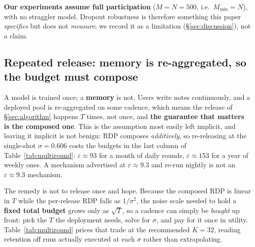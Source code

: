 \documentclass[pdflatex,sn-mathphys-num,iicol]{sn-jnl}
\theoremstyle{thmstyleone}%
\theoremstyle{thmstyletwo}%
\theoremstyle{thmstylethree}%
\newcommand{\eps}{\varepsilon}
\newcommand{\secref}[1]{\S\ref{#1}}
\begin{document}
\textbf{Our experiments assume full participation} ($M = N = 500$, i.e.\
$M_{\min} = N$), with no straggler model. Dropout robustness is therefore something
this paper \emph{specifies} but does not \emph{measure}; we record it as a limitation
(\secref{sec:discussion}), not a claim.

\subsection{Repeated release: memory is re-aggregated, so the budget must
compose}\label{sec:multiround}

A model is trained once; a \textbf{memory} is not. Users write notes continuously, and
a deployed pool is re-aggregated on some cadence, which means the release of
\secref{sec:algorithm} happens $T$ times, not once, and \textbf{the guarantee that
matters is the composed one}. This is the assumption most easily left implicit, and
leaving it implicit is not benign: RDP composes \emph{additively}, so re-releasing at
the single-shot $\sigma = 0.606$ costs the budgets in the last column of
Table~\ref{tab:multiround}: $\eps \approx 93$ for a month of daily rounds, $\eps
\approx 153$ for a year of weekly ones. A mechanism advertised at $\eps \approx 9.3$
and re-run nightly is not an $\eps \approx 9.3$ mechanism.

The remedy is not to release once and hope. Because the composed RDP is linear in $T$
while the per-release RDP falls as $1/\sigma^{2}$, the noise scale needed to hold a
\textbf{fixed total budget} grows only as $\sqrt{T}$, so a cadence can simply be
\emph{bought} up front: pick the $T$ the deployment needs, solve for $\sigma$, and pay
for it once in utility. Table~\ref{tab:multiround} prices that trade at the recommended
$K = 32$, reading retention off runs actually executed at each $\sigma$ rather than
extrapolating.
\end{document}

